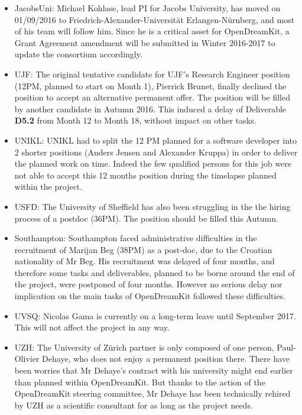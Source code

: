 \documentclass{deliverablereport}
\begin{document}
\begin{itemize}
\item{JacobsUni:} Michael Kohlase, lead PI for Jacobs University, has
  moved on 01/09/2016 to Friedrich-Alexander-Universität
  Erlangen-Nürnberg, and most of his team will follow him. Since he is
  a critical asset for OpenDreamKit, a Grant Agreement amendment will
  be submitted in Winter 2016-2017 to update the consortium accordingly.\\

\item{UJF:} The original tentative candidate for UJF's Research
  Engineer position (12PM, planned to start on Month 1), Pierrick
  Brunet, finally declined the position to accept an alternative
  permanent offer. The position will be filled by another candidate in
  Autumn 2016. This induced a delay of Deliverable \textbf{D5.2} from Month 12
  to Month 18, without impact on other tasks.\\

\item{UNIKL:} UNIKL had to split the 12 PM planned for a software developer into 2 shorter positions (Anders Jensen and Alexander Kruppa) in order to deliver the planned work on time. Indeed the few qualified persons for this job were not able to accept this 12 months position during the timelapse planned within the project.\\

\item{USFD:} The University of Sheffield has also been struggling in the the hiring process of a postdoc (36PM). The position should be filled this Autumn.\\

\item{Southampton:} Southampton faced administrative difficulties in the recruitment of Marijan Beg (38PM) as a post-doc, due to the Croatian nationality of Mr Beg. His recruitment was delayed of four months, and therefore some tasks and deliverables, planned to be borne around the end of the project, were postponed of four months. However no serious delay nor implication on the main tasks of OpenDreamKit followed these difficulties.\\

\item{UVSQ:} Nicolas Gama is currently on a long-term leave until September 2017. This will not affect the project in any way.\\

\item{UZH:} The University of Zürich partner is only composed of one person, Paul-Olivier Dehaye, who does not enjoy a permanent position there. There have been worries that Mr Dehaye's contract with his university might end earlier than planned within OpenDreamKit. But thanks to the action of the OpenDreamKit steering committee, Mr Dehaye has been technically rehired by UZH as a scientific consultant for as long as the project needs.\\


\end{itemize}
\end{document}
